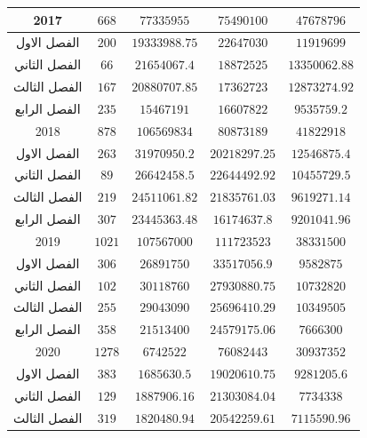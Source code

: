 \documentclass[10pt,a4paper]{report}
\begin{document}
\begin{longtable}{|c|c|c|c|c|}
2017         & $668$                 & $77335955$       & $75490100$     & $47678796$         \\ \hline
الفصل الاول  & $200$                 & $19333988.75$    & $22647030$     & $11919699$         \\ \hline
الفصل الثاني & $66$                  & $21654067.4$     & $18872525$     & $13350062.88$      \\ \hline
الفصل الثالث & $167$                 & $20880707.85$    & $17362723$     & $12873274.92$      \\ \hline
الفصل الرابع & $235$                 & $15467191$       & $16607822$     & $9535759.2$        \\ \hline
2018         & $878$                 & $106569834$      & $80873189$     & $41822918$         \\ \hline
الفصل الاول  & $263$                 & $31970950.2$     & $20218297.25$  & $12546875.4$       \\ \hline
الفصل الثاني & $89$                  & $26642458.5$     & $22644492.92$  & $10455729.5$       \\ \hline
الفصل الثالث & $219$                 & $24511061.82$    & $21835761.03$  & $9619271.14$       \\ \hline
الفصل الرابع & $307$                 & $23445363.48$    & $16174637.8$   & $9201041.96$       \\ \hline
2019         & $1021$                & $107567000$      & $111723523$    & $38331500$         \\ \hline
الفصل الاول  & $306$                 & $26891750$       & $33517056.9$   & $9582875$          \\ \hline
الفصل الثاني & $102$                 & $30118760$       & $27930880.75$  & $10732820$         \\ \hline
الفصل الثالث & $255$                 & $29043090$       & $25696410.29$  & $10349505$         \\ \hline
الفصل الرابع & $358$                 & $21513400$       & $24579175.06$  & $7666300$          \\ \hline
2020         & $1278$                & $6742522$        & $76082443$     & $30937352$         \\ \hline
الفصل الاول  & $383$                 & $1685630.5$      & $19020610.75$  & $9281205.6$        \\ \hline
الفصل الثاني & $129$                 & $1887906.16$     & $21303084.04$  & $7734338$          \\ \hline
الفصل الثالث & $319$                 & $1820480.94$     & $20542259.61$  & $7115590.96$       \\ \hline

\end{longtable}
\end{document}
